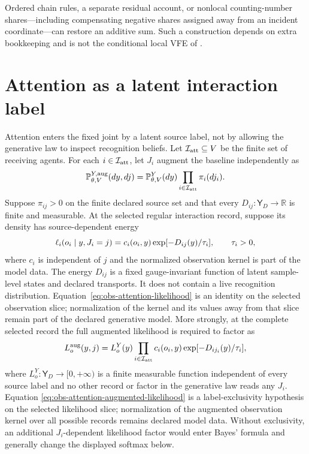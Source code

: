 Ordered chain rules, a separate residual account, or nonlocal counting-number
shares---including compensating negative shares assigned away from an incident
coordinate---can restore an additive sum.  Such a construction depends on
extra bookkeeping and is not the conditional local VFE of
.

\section{Attention as a latent interaction label}
\label{sec:local-attention-elbo}

Attention enters the fixed joint by a latent source label, not by allowing the
generative law to inspect recognition beliefs.  Let
$\mathcal I_{\rm att}\subseteq V$ be the finite set of receiving agents.  For
each $i\in\mathcal I_{\rm att}$, let $J_i$ augment the baseline independently
as
\begin{equation}
\mathbb P_{\theta,V}^{Y,\mathrm{aug}}(dy,dj)
=\mathbb P_{\theta,V}^{Y}(dy)
\prod_{i\in\mathcal I_{\rm att}}\pi_i(dj_i).
\label{eq:obs-attention-augmented-baseline}
\end{equation}
Suppose $\pi_{ij}>0$ on the finite declared source set and that every
\(D_{ij}:\mathsf Y_D\to\mathbb R\) is finite and measurable. At the selected
regular interaction record, suppose its density has source-dependent energy
\begin{equation}
\ell_i(o_i\mid y,J_i=j)
=c_i(o_i,y)\exp[-D_{ij}(y)/\tau_i],
\qquad \tau_i>0,
\label{eq:obs-attention-likelihood}
\end{equation}
where $c_i$ is independent of $j$ and the normalized observation kernel is
part of the model data.  The energy $D_{ij}$ is a fixed gauge-invariant
function of latent sample-level states and declared transports.  It does not
contain a live recognition distribution.  Equation~\eqref{eq:obs-attention-likelihood}
is an identity on the selected observation slice; normalization of the kernel
and its values away from that slice remain part of the declared generative
model.  More strongly, at the complete selected record the full augmented
likelihood is required to factor as
\begin{equation}
L_o^{\rm aug}(y,j)
=L_o^Y(y)\prod_{i\in\mathcal I_{\rm att}}
c_i(o_i,y)\exp[-D_{ij_i}(y)/\tau_i],
\label{eq:obs-attention-augmented-likelihood}
\end{equation}
where \(L_o^Y:\mathsf Y_D\to[0,+\infty)\) is a finite measurable function
independent of every source label and no other record or factor in the
generative law reads any $J_i$.  Equation
\eqref{eq:obs-attention-augmented-likelihood} is a label-exclusivity
hypothesis on the selected likelihood slice; normalization of the augmented
observation kernel over all possible records remains declared model data.
Without exclusivity, an additional $J_i$-dependent likelihood factor would
enter Bayes' formula and generally change the displayed softmax below.

